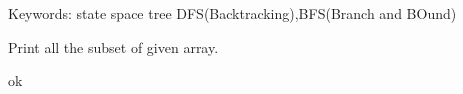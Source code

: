 Keywords:
state space tree
DFS(Backtracking),BFS(Branch and BOund)

\begin{exercise}
    \begin{compactenum}
        \item Print all the subset of given array.
    \end{compactenum}
    
\end{exercise}


\begin{problem}
    ok
\end{problem}